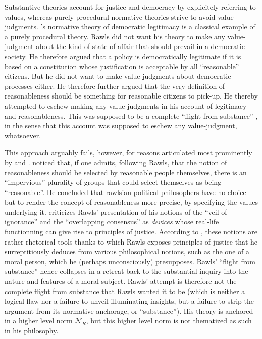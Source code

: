 \documentclass[preprint, french, english, 11pt, authoryear]{elsarticle}%
\begin{document}
Substantive theories account for justice and democracy by explicitely referring to values, whereas purely procedural normative theories strive to avoid value-judgments. \cite{rawls_political_2005}'s normative theory of democratic legitimacy is a classical example of a purely procedural theory. Rawls did not want his theory to make any value-judgment about the kind of state of affair that should prevail in a democratic society. He therefore argued that a policy is democratically legitimate if it is based on a constitution whose justification is acceptable by all  “reasonable” citizens. But he did not want to make value-judgments about democratic processes either. He therefore further argued that the very definition of reasonableness should be something for reasonable citizens to pick-up. He thereby attempted to eschew making any value-judgments in his account of legitimacy and reasonableness. This was supposed to be a complete ``flight from substance'' \citep{estlund_democratic_2009}, in the sense that this account was supposed to eschew any value-judgment, whatsoever.%

This approach arguably fails, however, for reasons articulated most prominently by \cite{habermas_reconciliation_1995} and \cite{estlund_democratic_2009}. \citet{estlund_democratic_2009} noticed that, if one admits, following Rawls, that the notion of reasonableness should be selected by reasonable people themselves, there is an “impervious” plurality of groups that could select themselves as being “reasonable”. He concluded that rawlsian political philosophers have no choice but to render the concept of reasonableness more precise, by specifying the values underlying it. \cite{habermas_reconciliation_1995} criticizes Rawls' presentation of his notions of the “veil of ignorance” and the “overlapping consensus” as \emph{devices} whose real-life functionning can give rise to principles of justice. According to \cite{habermas_reconciliation_1995}, these notions are rather rhetorical tools thanks to which Rawls exposes principles of justice that he surreptitiously deduces from various philosophical notions, such as the one of a moral person, which he (perhaps unconsciously) presupposes. Rawls' ``flight from substance'' hence collapses in a retreat back to the substantial inquiry into the nature and features of a moral subject.  Rawls' attempt is therefore not the complete flight from substance that Rawls wanted it to be (which is neither a logical flaw nor a failure to unveil illuminating insights, but a failure to strip the argument from its normative anchorage, or “substance”). His theory is anchored in a higher level norm $\mathscr{N}_R$, but this higher level norm is not thematized as such in his philosophy.
\end{document}
